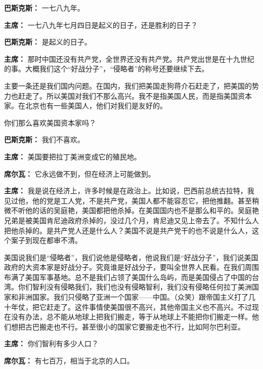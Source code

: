 \begin{list}{}
\item[\textbf{巴斯克斯：}] 一七八九年。

\item[\textbf{主席：}] 一七八九年七月四日是起义的日子，还是胜利的日子？

\item[\textbf{巴斯克斯：}] 是起义的日子。

\item[\textbf{主席：}] 那时中国还没有共产党，全世界还没有共产党。共产党出世是在十九世纪的事。大概我们这个“好战分子”，“侵略者”的称号还要继续下去。

主要一条还是我们国内问题。在国内，我们把美国走狗蒋介石赶走了，把美国的势力也赶走了。所以美国对我们不那么高兴。我不是指美国人民，而是指美国资本家。在北京也有一些美国人，他们对我们是友好的。

你们那么喜欢美国资本家吗？

\item[\textbf{巴斯克斯：}] 我们不喜欢。

\item[\textbf{主席：}] 美国要把拉丁美洲变成它的殖民地。

\item[\textbf{席尔瓦：}] 它永远做不到，但在经济上可能做到。

\item[\textbf{主席：}] 我是说在经济上，许多时候是在政治上。比如说，巴西前总统古拉特，我见过他，他的党是工人党，不是共产党，美国人都不能容忍它，把他推翻。甚至稍微不听他的话的吴庭艳，美国都把他杀掉。在美国国内也不是那么和平的。吴庭艳兄弟是被美国肯尼迪政府杀掉的，没过几个月，肯尼迪又见上帝去了。不知什么人把他杀掉的。是共产党人还是什么人？美国不说是共产党干的也不说是什么人，这个案子到现在都审不清。

美国说我们是“侵略者”，我们说他是侵略者，他说我们是“好战分子”，我们说美国政府的大资本家是好战分子。究竟谁是好战分子，要叫全世界人民看。在我们周围布满了美国军事基地。总不是我们占领了美国什么岛屿，而是美国侵占了中国的台湾。你们智利没有侵略我们，我们也没有侵略智利，我们没有侵略任何拉丁美洲国家和非洲国家。我们只侵略了亚洲一个国家——中国。（众笑）跟帝国主义打了几十年仗，把它赶走了。这件事情使美国很不高兴，其他帝国主义也不高兴。不过现在没有办法，总不能从地球上把我们搬走，等于从地球上不能把你们搬走一样。他们想把古巴搬走也不行。甚至很小的国家它要搬走也不行，比如阿尔巴利亚。

\item[\textbf{主席：}] 你们智利有多少人口？

\item[\textbf{席尔瓦：}] 有七百万，相当于北京的人口。


\end{list}
